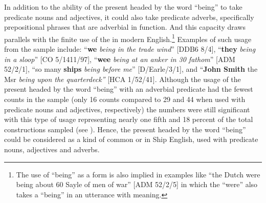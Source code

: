 In addition to the ability of the present  headed by the word “being” to take predicate nouns and adjectives, it could also take predicate adverbs, specifically prepositional phrases that are adverbial in function. And this capacity draws parallels with the finite use of the  in modern English.\footnote{The use of “being” as a  form is also implied in examples like “the Dutch were being about 60 Sayle of men of war” [ADM 52/2/5] in which the  “were” also takes a  “being” in an utterance with  meaning.}  Examples of such usage from the sample include: “\textbf{we} \textit{being in the trade wind}” [DDB6 8/4], “\textbf{they} \textit{being in a sloop}” [CO 5/1411/97], “\textbf{wee} \textit{being at an anker in 30 fathom}” [ADM 52/2/1], “so many \textbf{ships} \textit{being before me}” [D/Earle/3/1], and “\textbf{John Smith} the Msr \textit{being upon the quarterdeck”} [HCA 1/52/41]. Although the usage of the present  headed by the word “being” with an adverbial predicate had the fewest counts in the sample (only 16 counts compared to 29 and 44 when used with predicate nouns and adjectives, respectively) the numbers were still significant with this type of usage representing nearly one fifth and 18 percent of the total constructions sampled (see ). Hence, the present  headed by the word “being” could be considered as a kind of common  or  in Ship English, used with predicate nouns, adjectives and adverbs. 

